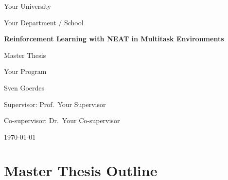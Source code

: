 \documentclass[12pt]{article}
\newcommand{\ThesisTitle}{Reinforcement Learning with NEAT in Multitask Environments}
\newcommand{\ThesisAuthor}{Sven Goerdes}
\newcommand{\ThesisDegree}{Master Thesis}
\newcommand{\ThesisProgram}{Your Program}
\newcommand{\ThesisUniversity}{Your University}
\newcommand{\ThesisDepartment}{Your Department / School}
\newcommand{\ThesisSupervisor}{Supervisor: Prof.\ Your Supervisor}
\newcommand{\ThesisCoSupervisor}{Co-supervisor: Dr.\ Your Co-supervisor}
\newcommand{\ThesisDate}{\today}
\begin{document}
\begin{titlepage}
  \thispagestyle{empty}
  \centering

  {\Large \ThesisUniversity\par}
  {\large \ThesisDepartment\par}
  \vfill

  {\LARGE\bfseries \ThesisTitle\par}
  \vspace{1.5cm}

  {\large \ThesisDegree\par}
  {\large \ThesisProgram\par}
  \vfill

  {\large \ThesisAuthor\par}
  \vspace{0.5cm}
  {\large \ThesisSupervisor\par}
  {\large \ThesisCoSupervisor\par}
  \vfill

  {\large \ThesisDate\par}
\end{titlepage}

\section*{Master Thesis Outline}

\tableofcontents

\bigskip

\newpage

\newpage

%
%
\end{document}
